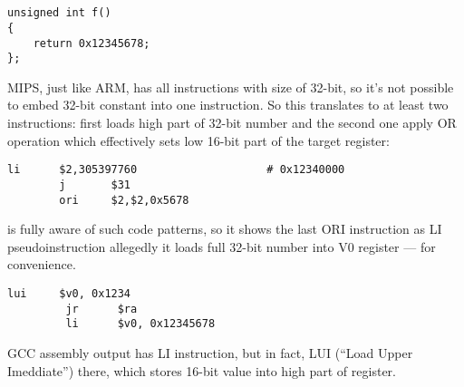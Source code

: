 ﻿\ifx\RUSSIAN\undefined
\section{}

\begin{lstlisting}
unsigned int f()
{
	return 0x12345678;
};
\end{lstlisting}

MIPS, just like ARM, has all instructions with size of 32-bit, so it's not possible to
embed 32-bit constant into one instruction.
So this translates to at least two instructions: 
first loads high part of 32-bit number and the second
one apply OR operation which effectively sets low 16-bit part of the target register:

\begin{lstlisting}[caption=GCC 4.4.5 -O3 (assembly output)]
        li      $2,305397760                    # 0x12340000
        j       $31
        ori     $2,$2,0x5678
\end{lstlisting}

\IDA is fully aware of such code patterns, so it shows the last ORI instruction as LI pseudoinstruction
allegedly it loads full 32-bit number into V0 register --- for convenience.


\begin{lstlisting}[caption=GCC 4.4.5 -O3 (IDA)]
         lui     $v0, 0x1234
         jr      $ra
         li      $v0, 0x12345678
\end{lstlisting}

GCC assembly output has LI instruction, but in fact, LUI (``Load Upper Imeddiate'') there,
which stores 16-bit value into high part of register.

\fi
